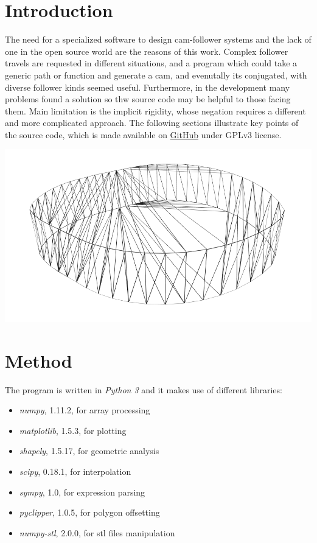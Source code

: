 \documentclass[a4paper,10pt,twoside]{article}
\begin{document}
\section{Introduction}
    The need for a specialized software to design cam-follower systems and the lack of one in the open source world
    are the reasons of this work. Complex follower travels are requested in different situations, and a program which
    could take a generic path or function and generate a cam, and evenutally its conjugated, with diverse follower kinds
    seemed useful. Furthermore, in the development many problems found a solution so thw source code may be helpful to those facing them.
    Main limitation is the implicit rigidity, whose negation requires a different and more complicated approach.
    The following sections illustrate key points of the source code, which is made available
    on \href{https://github.com/fciotti/camdesign}{GitHub} under GPLv3 license.

    \includegraphics[width=\textwidth]{render.png}

\section{Method}
    The program is written in \emph{Python 3} and it makes use of different libraries:

    \begin{itemize}[itemsep=0pt,topsep=0pt]
        \item
          \emph{numpy}, 1.11.2, for array processing
        \item
          \emph{matplotlib}, 1.5.3, for plotting
        \item
          \emph{shapely}, 1.5.17, for geometric analysis
        \item
          \emph{scipy}, 0.18.1, for interpolation
        \item
          \emph{sympy}, 1.0, for expression parsing
        \item
          \emph{pyclipper}, 1.0.5, for polygon offsetting
        \item
          \emph{numpy-stl}, 2.0.0, for stl files manipulation
    \end{itemize}
\end{document}

